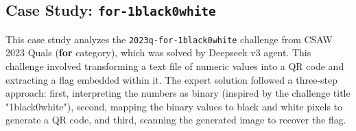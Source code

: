 





\subsection{Case Study: \texttt{for-1black0white}}
This case study analyzes the \texttt{2023q-for-1black0white} challenge from CSAW 2023 Quals (\textbf{for} category), which was solved by Deepseek v3 agent.
This challenge involved transforming a text file of numeric values into a QR code and extracting a flag embedded within it. The expert solution followed a three-step approach: first, interpreting the numbers as binary (inspired by the challenge title "1black0white"), second, mapping the binary values to black and white pixels to generate a QR code, and third, scanning the generated image to recover the flag.

